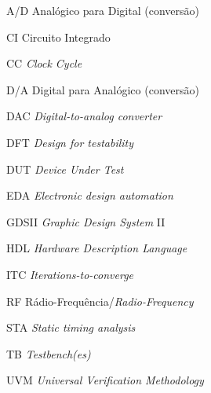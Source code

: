 \begin{siglas}
  \item [A/D  ] Analógico para Digital (conversão) 
  \item [CI   ] Circuito Integrado
  \item [CC   ] \textit{Clock Cycle}
  \item [D/A  ] Digital para Analógico (conversão) 
  \item [DAC  ] \textit{Digital-to-analog converter}
  \item [DFT  ] \textit{Design for testability}
  \item [DUT  ] \textit{Device Under Test}
  \item [EDA  ] \textit{Electronic design automation}
  \item [GDSII] \textit{Graphic Design System} II
  \item [HDL  ] \textit{Hardware Description Language}
  \item [ITC  ] \textit{Iterations-to-converge}
  \item [RF   ] Rádio-Frequência/\textit{Radio-Frequency}
  \item [STA  ] \textit{Static timing analysis}
  \item [TB   ] \textit{Testbench(es)}
  \item [UVM  ] \textit{Universal Verification Methodology}
\end{siglas}
